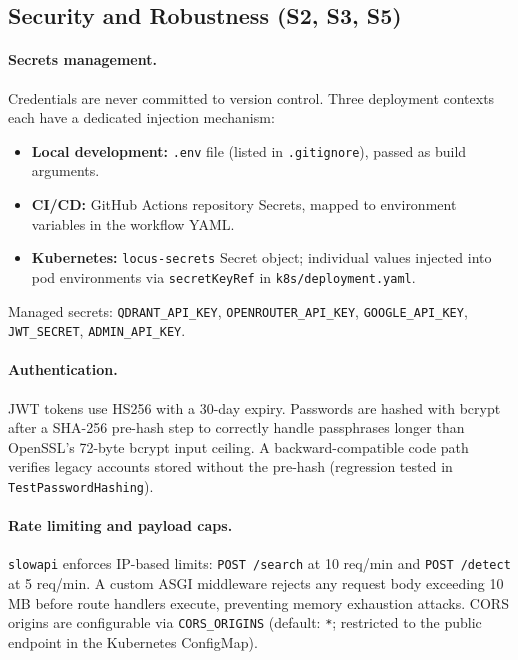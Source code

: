 \documentclass[12pt]{article}
\begin{document}
\subsection{Security and Robustness (S2, S3, S5)}

\paragraph{Secrets management.}
Credentials are never committed to version control. Three deployment contexts each have a dedicated injection mechanism:
\begin{itemize}[leftmargin=*, itemsep=2pt]
  \item \textbf{Local development:} \texttt{.env} file (listed in \texttt{.gitignore}), passed as build arguments.
  \item \textbf{CI/CD:} GitHub Actions repository Secrets, mapped to environment variables in the workflow YAML.
  \item \textbf{Kubernetes:} \texttt{locus-secrets} Secret object; individual values injected into pod environments via \texttt{secretKeyRef} in \texttt{k8s/deployment.yaml}.
\end{itemize}
Managed secrets: \texttt{QDRANT\_API\_KEY}, \texttt{OPENROUTER\_API\_KEY}, \texttt{GOOGLE\_API\_KEY}, \texttt{JWT\_SECRET}, \texttt{ADMIN\_API\_KEY}.

\paragraph{Authentication.}
JWT tokens use HS256 with a 30-day expiry. Passwords are hashed with bcrypt after a SHA-256 pre-hash step to correctly handle passphrases longer than OpenSSL's 72-byte bcrypt input ceiling. A backward-compatible code path verifies legacy accounts stored without the pre-hash (regression tested in \texttt{TestPasswordHashing}).

\paragraph{Rate limiting and payload caps.}
\texttt{slowapi} enforces IP-based limits: \texttt{POST /search} at 10 req/min and \texttt{POST /detect} at 5 req/min. A custom ASGI middleware rejects any request body exceeding 10\,MB before route handlers execute, preventing memory exhaustion attacks. CORS origins are configurable via \texttt{CORS\_ORIGINS} (default: \texttt{*}; restricted to the public endpoint in the Kubernetes ConfigMap).
\end{document}
